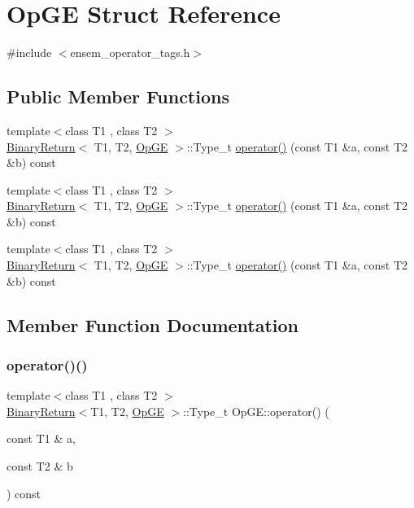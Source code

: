 \hypertarget{structOpGE}{}\section{Op\+GE Struct Reference}
\label{structOpGE}


{\ttfamily \#include $<$ensem\+\_\+operator\+\_\+tags.\+h$>$}

\subsection*{Public Member Functions}
\begin{DoxyCompactItemize}
\item 
{\footnotesize template$<$class T1 , class T2 $>$ }\\\mbox{\hyperlink{structBinaryReturn}{Binary\+Return}}$<$ T1, T2, \mbox{\hyperlink{structOpGE}{Op\+GE}} $>$\+::Type\+\_\+t \mbox{\hyperlink{structOpGE_a464b5c9cd38cdcfa8a0d8349c76e99a7}{operator()}} (const T1 \&a, const T2 \&b) const
\item 
{\footnotesize template$<$class T1 , class T2 $>$ }\\\mbox{\hyperlink{structBinaryReturn}{Binary\+Return}}$<$ T1, T2, \mbox{\hyperlink{structOpGE}{Op\+GE}} $>$\+::Type\+\_\+t \mbox{\hyperlink{structOpGE_a464b5c9cd38cdcfa8a0d8349c76e99a7}{operator()}} (const T1 \&a, const T2 \&b) const
\item 
{\footnotesize template$<$class T1 , class T2 $>$ }\\\mbox{\hyperlink{structBinaryReturn}{Binary\+Return}}$<$ T1, T2, \mbox{\hyperlink{structOpGE}{Op\+GE}} $>$\+::Type\+\_\+t \mbox{\hyperlink{structOpGE_a464b5c9cd38cdcfa8a0d8349c76e99a7}{operator()}} (const T1 \&a, const T2 \&b) const
\end{DoxyCompactItemize}


\subsection{Member Function Documentation}
\mbox{\label{structOpGE_a464b5c9cd38cdcfa8a0d8349c76e99a7}} 
\subsubsection{\texorpdfstring{operator()()}{operator()()}\hspace{0.1cm}{\footnotesize\ttfamily [1/3]}}
{\footnotesize\ttfamily template$<$class T1 , class T2 $>$ \\
\mbox{\hyperlink{structBinaryReturn}{Binary\+Return}}$<$T1, T2, \mbox{\hyperlink{structOpGE}{Op\+GE}} $>$\+::Type\+\_\+t Op\+G\+E\+::operator() (\begin{DoxyParamCaption}\item[{const T1 \&}]{a,  }\item[{const T2 \&}]{b }\end{DoxyParamCaption}) const\hspace{0.3cm}{\ttfamily [inline]}}


